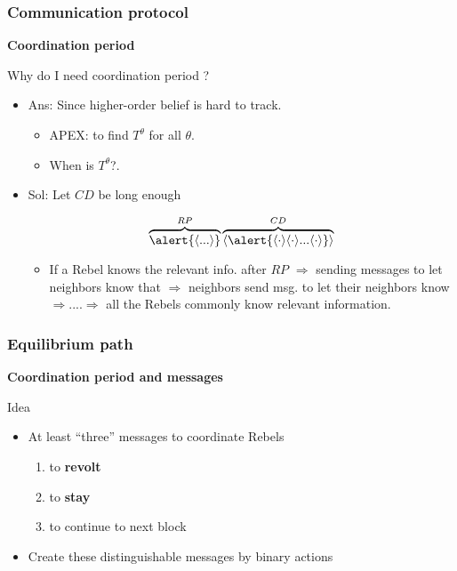 \documentclass[10pt]{beamer}
\begin{document}
\begin{frame}
  \frametitle{Communication protocol}

\textbf{Coordination period}

Why do I need coordination period ?
\begin{itemize}
\item Ans: Since higher-order belief is hard to track.

\begin{itemize}
\item APEX: to find $T^{\theta}$ for all $\theta$.
\item When is $T^{\theta}$?.
\end{itemize}
\item Sol: Let $CD$ be long enough

\[\overbrace{\alert{\langle ... \rangle}}^{RP}\overbrace{\langle \alert{\langle \cdot \rangle \langle \cdot \rangle...\langle \cdot \rangle}\rangle}^{CD}\] 
\begin{itemize}
\item If a Rebel knows the relevant info. after $RP$ $\Rightarrow$ sending messages to let neighbors know that {$\Rightarrow$ neighbors send msg. to let their neighbors know $\Rightarrow$....$\Rightarrow$ \alert{all the Rebels commonly know relevant information}.}
\end{itemize}

\end{itemize}

\end{frame}





\begin{frame}
\frametitle{Equilibrium path}

\textbf{Coordination period and messages}

Idea
\begin{itemize}
\item At least ``\alert{three}'' messages to coordinate Rebels
\begin{enumerate}
\item to \textbf{revolt}
\item to \textbf{stay}
\item to continue to next block 
\end{enumerate}
\item Create these \alert{distinguishable} messages by binary actions
\end{itemize}



\end{frame}
\end{document}
